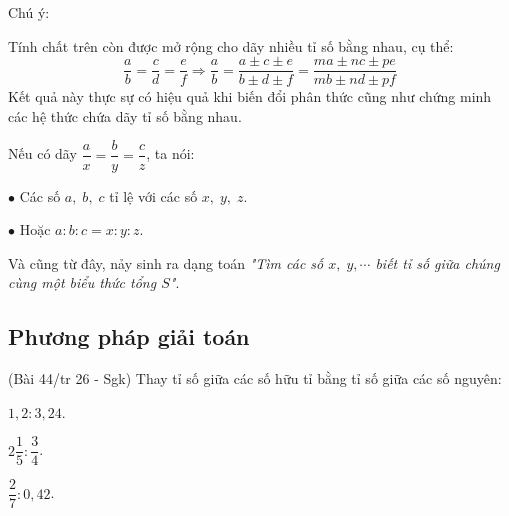 \begin{note}
	Chú ý:
	\begin{listEX}[]
		\item Tính chất trên còn được mở rộng cho dãy nhiều tỉ số bằng nhau, cụ thể:
		\[\dfrac{a}{b} = \dfrac{c}{d} = \dfrac{e}{f} \Rightarrow \dfrac{a}{b} = \dfrac{a \pm c \pm e}{b \pm d \pm f} = \dfrac{ma \pm nc \pm pe}{mb \pm nd \pm pf} \]
		Kết quả này thực sự có hiệu quả khi biến đổi phân thức cũng như chứng minh các hệ thức chứa dãy tỉ số bằng nhau.
		\item Nếu có dãy $\dfrac{a}{x} = \dfrac{b}{y} = \dfrac{c}{z}$, ta nói:
		
			\item[$\bullet$] Các số $a, \; b, \; c$ tỉ lệ với các số $x, \; y, \; z$.
			\item[$\bullet$] Hoặc $a:b:c = x:y:z$.
		
	\item Và cũng từ đây, nảy sinh ra dạng toán \textit{"Tìm các số $x, \; y,\cdots$ biết tỉ số giữa chúng cùng một biểu thức tổng $S$"}.
	\end{listEX}
\end{note}

\subsection{Phương pháp giải toán}
\begin{vd}%
	(Bài 44/tr 26 - Sgk) Thay tỉ số giữa các số hữu tỉ bằng tỉ số giữa các số nguyên:
	\begin{listEX}[]
		\item $1,2:3,24$.
		\item $2\dfrac{1}{5}:\dfrac{3}{4}$.
		\item $\dfrac{2}{7}:0,42$.
	\end{listEX}
\end{vd}

